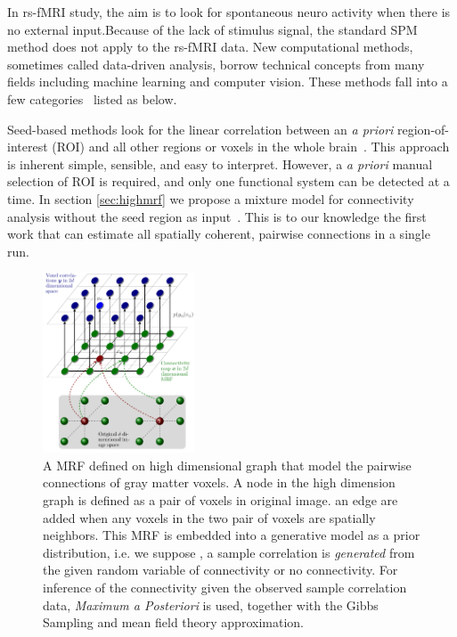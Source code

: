\documentclass[12pt]{article}
\begin{document}
In rs-fMRI study, the aim is to look for spontaneous neuro activity when there
is no external input.Because of the lack of stimulus signal, the standard SPM
method does not apply to the rs-fMRI data. New computational methods, sometimes
called data-driven analysis, borrow technical concepts from many fields
including machine learning and computer vision. These methods fall into a few
categories~\cite{margulies2010resting} listed as below.

Seed-based methods look for the linear correlation between an \emph{a priori}
region-of-interest (ROI) and all other regions or voxels in the whole
brain~\cite{fox2005human}. This approach is inherent simple, sensible, and easy
to interpret. However, a \emph{a priori} manual selection of ROI is required,
and only one functional system can be detected at a time. In section
\ref{sec:highmrf} we propose a mixture model for connectivity analysis without
the seed region as input~\cite{liu2010spatial}. This is to our knowledge the first
work that can estimate all spatially coherent, pairwise connections in a single
run.

\begin{figure}
  \includegraphics[width=0.4\textwidth]{figures/6dmrf}
  \caption{A MRF defined on high dimensional graph that model the pairwise
  connections of gray matter voxels. A node in the high dimension graph is
  defined as a pair of voxels in original image. an edge are added when any
  voxels in the two pair of voxels are spatially neighbors. This MRF is embedded
  into a generative model as a prior distribution, i.e. we suppose , a sample
  correlation is \emph{generated} from the given random variable of connectivity
  or no connectivity. For inference of the connectivity given the observed
  sample correlation data, \emph{Maximum a Posteriori} is used, together with
  the Gibbs Sampling and mean field theory approximation. }
  \label{fig:6dmrf}
\end{figure}
\end{document}
